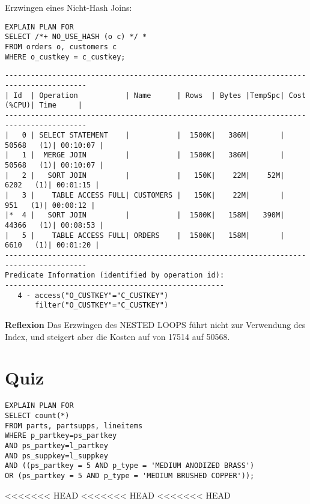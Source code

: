 \documentclass[10pt]{article}
\begin{document}
Erzwingen eines Nicht-Hash Joins:
\begin{lstlisting}[style=sql]
EXPLAIN PLAN FOR
SELECT /*+ NO_USE_HASH (o c) */ *
FROM orders o, customers c
WHERE o_custkey = c_custkey;
\end{lstlisting}
\begin{lstlisting}[style=queryexecutionplan]
-----------------------------------------------------------------------------------------
| Id  | Operation           | Name      | Rows  | Bytes |TempSpc| Cost (%CPU)| Time     |
-----------------------------------------------------------------------------------------
|   0 | SELECT STATEMENT    |           |  1500K|   386M|       | 50568   (1)| 00:10:07 |
|   1 |  MERGE JOIN         |           |  1500K|   386M|       | 50568   (1)| 00:10:07 |
|   2 |   SORT JOIN         |           |   150K|    22M|    52M|  6202   (1)| 00:01:15 |
|   3 |    TABLE ACCESS FULL| CUSTOMERS |   150K|    22M|       |   951   (1)| 00:00:12 |
|*  4 |   SORT JOIN         |           |  1500K|   158M|   390M| 44366   (1)| 00:08:53 |
|   5 |    TABLE ACCESS FULL| ORDERS    |  1500K|   158M|       |  6610   (1)| 00:01:20 |
-----------------------------------------------------------------------------------------
Predicate Information (identified by operation id):
---------------------------------------------------
   4 - access("O_CUSTKEY"="C_CUSTKEY")
       filter("O_CUSTKEY"="C_CUSTKEY")
\end{lstlisting}
\textbf{Reflexion} \newline
Das Erzwingen des NESTED LOOPS führt nicht zur Verwendung des Index, und steigert aber die Kosten auf von 17514 auf 50568.

\section{Quiz}
\begin{lstlisting}[style=sql]
EXPLAIN PLAN FOR
SELECT count(*)
FROM parts, partsupps, lineitems
WHERE p_partkey=ps_partkey
AND ps_partkey=l_partkey
AND ps_suppkey=l_suppkey
AND ((ps_partkey = 5 AND p_type = 'MEDIUM ANODIZED BRASS')
OR (ps_partkey = 5 AND p_type = 'MEDIUM BRUSHED COPPER'));
\end{lstlisting}
<<<<<<< HEAD
<<<<<<< HEAD
<<<<<<< HEAD
\end{document}
